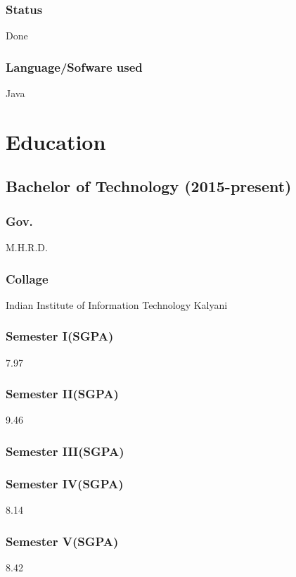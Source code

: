 \documentclass{article}
\begin{document}
\subsubsection{Status}  Done
\subsubsection{Language/Sofware used} Java

\section{Education}
\subsection{Bachelor of Technology (2015-present)}
\subsubsection{Gov.}	M.H.R.D.
\subsubsection{Collage}	Indian Institute of Information Technology Kalyani
\subsubsection{Semester I(SGPA)}	7.97
\subsubsection{Semester II(SGPA)}	9.46
\subsubsection{Semester III(SGPA)}	%
\subsubsection{Semester IV(SGPA)}	8.14
\subsubsection{Semester V(SGPA)}	8.42
\end{document}
